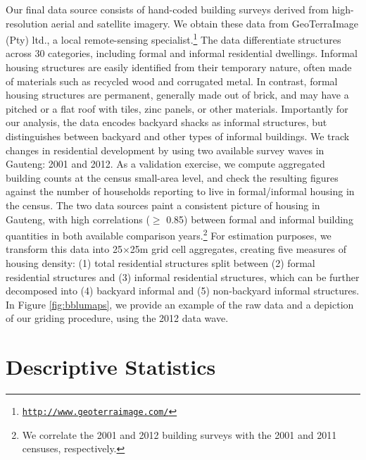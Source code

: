 \documentclass[12pt]{article}
\begin{document}
Our final data source consists of hand-coded building surveys derived from high-resolution aerial and satellite imagery. We obtain these data from GeoTerraImage (Pty) ltd., a local remote-sensing specialist.\footnote{\href{http://www.geoterraimage.com/}{\tt http://www.geoterraimage.com/}} The data differentiate structures across 30 categories, including formal and informal residential dwellings. Informal housing structures are easily identified from their temporary nature, often made of materials such as recycled wood and corrugated metal. In contrast, formal housing structures are permanent, generally made out of brick, and may have a pitched or a flat roof with tiles, zinc panels, or other materials. Importantly for our analysis, the data encodes backyard shacks as informal structures, but distinguishes between backyard and other types of informal buildings. We track changes in residential development by using two available survey waves in Gauteng: 2001 and 2012. As a validation exercise, we compute aggregated building counts at the census small-area level, and check the resulting figures against the number of households reporting to live in formal/informal housing in the census. The two data sources paint a consistent picture of housing in Gauteng, with high correlations ($\geq$ 0.85) between formal and informal building quantities in both available comparison years.\footnote{We correlate the 2001 and 2012 building surveys with the 2001 and 2011 censuses, respectively.} For estimation purposes, we transform this data into 25$\times$25m grid cell aggregates, creating five measures of housing density: (1) total residential structures split between (2) formal residential structures and (3) informal residential structures, which can be further decomposed into (4) backyard informal and (5) non-backyard informal structures.  In Figure \ref{fig:bblumaps}, we provide an example of the raw data and a depiction of our griding procedure, using the 2012 data wave.



\section{Descriptive Statistics}\label{section:descriptives}
\end{document}
